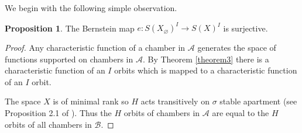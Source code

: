 \documentclass[12pt]{article}
\newcommand{\A}{\mathcal{A}}
\newcommand{\B}{\mathcal{B}}
\newcommand{\<}{\langle}
\renewcommand{\>}{\rangle}
\renewcommand{\emptyset}{\varnothing}
\theoremstyle{plain}
\theoremstyle{definition}
\newtheorem{prop}[theorem]{Proposition}
\begin{document}
We begin with the following simple observation.
\begin{prop}
\label{onto}
The Bernstein map $e:S(X_\emptyset)^I\rightarrow S(X)^I$ is surjective.
\end{prop}

\begin{proof}
Any characteristic function of a chamber in $\A$ generates the space of functions supported on chambers in $\A$. By Theorem \ref{theorem3} there is a characteristic function of an $I$ orbits which is mapped to a characteristic function of an $I$ orbit.

The space $X$ is of minimal rank so $H$ acts transitively on $\sigma$ stable apartment (see Proposition 2.1 of \cite{Ressayre_2010}). Thus the $H$ orbits of chambers in $\A$ are equal to the $H$ orbits of all chambers in $\B$.
\end{proof}
\end{document}
